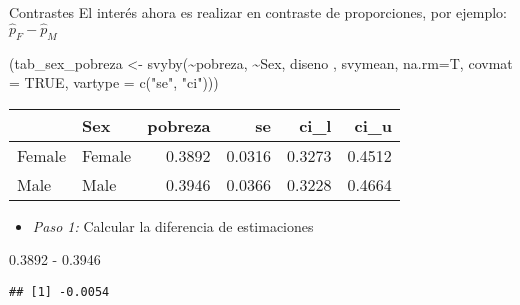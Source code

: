 \documentclass[
  ignorenonframetext,
]{beamer}
\newenvironment{Shaded}{\begin{snugshade}}{\end{snugshade}}
\newcommand{\AttributeTok}[1]{\textcolor[rgb]{0.77,0.63,0.00}{#1}}
\newcommand{\ConstantTok}[1]{\textcolor[rgb]{0.00,0.00,0.00}{#1}}
\newcommand{\FloatTok}[1]{\textcolor[rgb]{0.00,0.00,0.81}{#1}}
\newcommand{\FunctionTok}[1]{\textcolor[rgb]{0.00,0.00,0.00}{#1}}
\newcommand{\NormalTok}[1]{#1}
\newcommand{\OtherTok}[1]{\textcolor[rgb]{0.56,0.35,0.01}{#1}}
\newcommand{\SpecialCharTok}[1]{\textcolor[rgb]{0.00,0.00,0.00}{#1}}
\newcommand{\StringTok}[1]{\textcolor[rgb]{0.31,0.60,0.02}{#1}}
\providecommand{\tightlist}{%
  \setlength{\itemsep}{0pt}\setlength{\parskip}{0pt}}
\begin{document}
\begin{frame}[fragile]{Contrastes}
\protect\hypertarget{contrastes}{}
El interés ahora es realizar en contraste de proporciones, por ejemplo:
\(\hat{p}_F - \hat{p}_M\)

\begin{Shaded}
\begin{Highlighting}[]
\NormalTok{(tab\_sex\_pobreza }\OtherTok{\textless{}{-}} \FunctionTok{svyby}\NormalTok{(}\SpecialCharTok{\textasciitilde{}}\NormalTok{pobreza, }\SpecialCharTok{\textasciitilde{}}\NormalTok{Sex, }
\NormalTok{                          diseno , }
\NormalTok{                      svymean, }\AttributeTok{na.rm=}\NormalTok{T,}
                      \AttributeTok{covmat =} \ConstantTok{TRUE}\NormalTok{,}
                      \AttributeTok{vartype =} \FunctionTok{c}\NormalTok{(}\StringTok{"se"}\NormalTok{, }\StringTok{"ci"}\NormalTok{)))}
\end{Highlighting}
\end{Shaded}

\begin{longtable}[]{@{}llrrrr@{}}
\toprule
& Sex & pobreza & se & ci\_l & ci\_u \\
\midrule
\endhead
Female & Female & 0.3892 & 0.0316 & 0.3273 & 0.4512 \\
Male & Male & 0.3946 & 0.0366 & 0.3228 & 0.4664 \\
\bottomrule
\end{longtable}

\begin{itemize}[<+->]
\tightlist
\item
  \emph{Paso 1:} Calcular la diferencia de estimaciones
\end{itemize}

\begin{Shaded}
\begin{Highlighting}[]
\FloatTok{0.3892} \SpecialCharTok{{-}} \FloatTok{0.3946}          
\end{Highlighting}
\end{Shaded}

\begin{verbatim}
## [1] -0.0054
\end{verbatim}
\end{frame}
\end{document}
